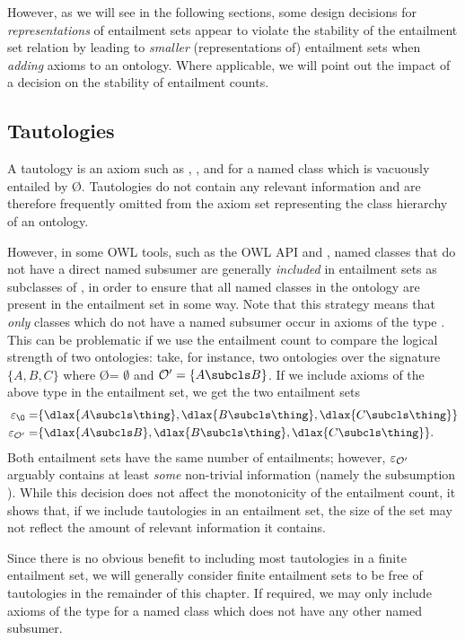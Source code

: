 However, as we will see in the following sections, some design decisions for \emph{representations} of entailment sets appear to violate the stability of the entailment set relation by leading to \emph{smaller} (representations of) entailment sets when \emph{adding} axioms to an ontology. Where applicable, we will point out the impact of a decision on the stability of entailment counts.


\subsection{Tautologies}
A tautology is an axiom such as , , and  for a named class  which is vacuously entailed by \O. Tautologies do not contain any relevant information and are therefore frequently omitted from the axiom set representing the class hierarchy of an ontology.

However, in some OWL tools, such as the OWL API and \protege, named classes that do not have a direct named subsumer are generally \emph{included} in entailment sets as subclasses of \thing, in order to ensure that all named classes in the ontology are present in the entailment set in some way. Note that this strategy means that \emph{only} classes which do not have a named subsumer occur in axioms of the type . This can be problematic if we use the entailment count to compare the logical strength of two ontologies: take, for instance, two ontologies over the signature $\{A, B, C\}$ where \O = $\emptyset$ and $\oprime = \{A \subcls B\}$. If we include axioms of the above type in the entailment set, we get the two entailment sets 
\begin{align*}
\varepsilon_{\O} =& \{ \dlax{A \subcls \thing}, \dlax{B \subcls \thing}, \dlax{C \subcls \thing}\}\\
\varepsilon_{\oprime} =& \{\dlax{A \subcls B}, \dlax{B \subcls \thing}, \dlax{C \subcls \thing}\}.
\end{align*}
Both entailment sets have the same number of entailments; however, $\varepsilon_{\mathcal{O'}}$ arguably contains at least \emph{some} non-trivial information (namely the subsumption ). While this decision does not affect the monotonicity of the entailment count, it shows that, if we include tautologies in an entailment set, the size of the set may not reflect the amount of relevant information it contains.

Since there is no obvious benefit to including most tautologies in a finite entailment set, we will generally consider finite entailment sets to be free of tautologies in the remainder of this chapter. If required, we may only include axioms of the type  for a named class  which does not have any other named subsumer. 


